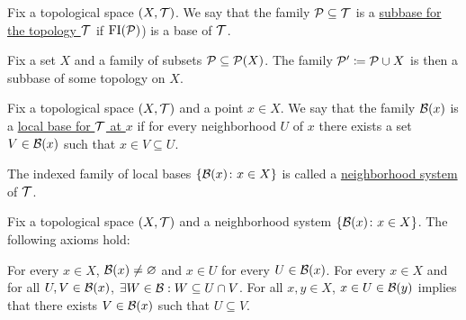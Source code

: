 \begin{definition}\label{def:topological_subbase}\cite[23]{Lectures:general_topology}
  Fix a topological space $(X, \mathcal T)$. We say that the family $\mathcal P \subseteq \mathcal T$ is a \uline{subbase for the topology $\mathcal T$} if $\operatorname{FI}(\mathcal P)$) is a base of $\mathcal T$.
\end{definition}

\begin{proposition}
  Fix a set $X$ and a family of subsets $\mathcal P \subseteq \operatorname{\mathcal P}(X)$. The family $\mathcal P' \coloneqq \mathcal P \cup X$ is then a subbase of some topology on $X$.
\end{proposition}

\begin{definition}\label{def:topological_local_base}\cite[31]{Lectures:general_topology}
  Fix a topological space $(X, \mathcal T)$ and a point $x \in X$. We say that the family $\mathcal B(x)$ is a \uline{local base for $\mathcal T$ at $x$} if for every neighborhood $U$ of $x$ there exists a set $V \in \mathcal B(x)$ such that $x \in V \subseteq U$.

  The indexed family of local bases $\{ \mathcal B(x) \colon x \in X \}$ is called a \uline{neighborhood system} of $\mathcal T$.
\end{definition}

\begin{proposition}\label{def:topological_local_base_axioms}\cite[31]{Lectures:general_topology}
  Fix a topological space $(X, \mathcal T)$ and a neighborhood system $\{ \mathcal B(x) \colon x \in X \}$. The following axioms hold:
  \begin{description}
     For every $x \in X$, $\mathcal B(x) \neq \varnothing$ and $x \in U$ for every $U \in \mathcal B(x)$.
     For every $x \in X$ and for all $U, V \in \mathcal B(x)$, $\exists W \in \mathcal B: W \subseteq U \cap V$.
     For all $x, y \in X$, $x \in U \in \mathcal B(y)$ implies that there exists $V \in \mathcal B(x)$ such that $U \subseteq V$.
  \end{description}
\end{proposition}
